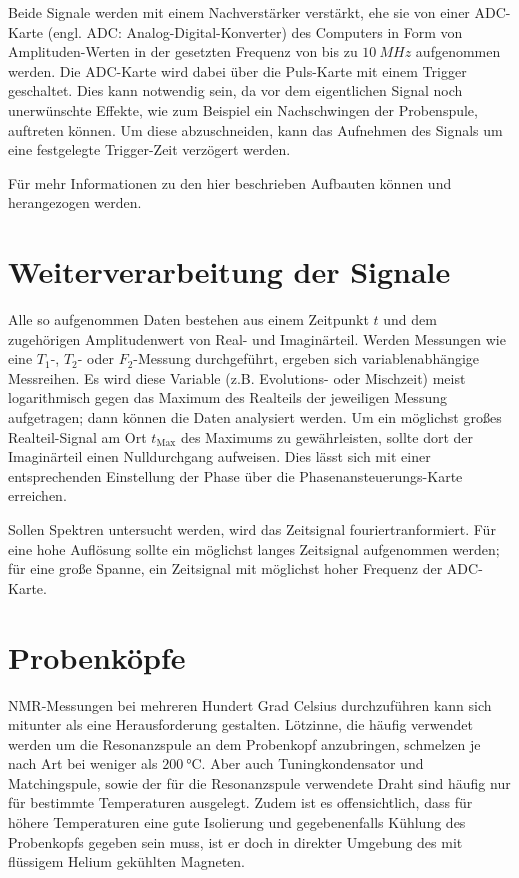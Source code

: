 Beide Signale werden mit einem Nachverstärker verstärkt, ehe sie von einer ADC-Karte (engl. ADC: Analog-Digital-Konverter) des Computers in Form von Amp\-li\-tu\-den-Wer\-ten in der gesetzten Frequenz von bis zu $\SI{10}{MHz}$ aufgenommen werden. Die ADC-Karte wird dabei über die Puls-Karte mit einem Trigger geschaltet. Dies kann notwendig sein, da vor dem eigentlichen Signal noch unerwünschte Effekte, wie zum Beispiel ein Nachschwingen der Probenspule, auftreten können. Um diese abzuschneiden, kann das Aufnehmen des Signals um eine festgelegte Trigger-Zeit verzögert werden.

Für mehr Informationen zu den hier beschrieben Aufbauten können \cite{lueg_implementierung_2016} und \cite{tilly_master} herangezogen werden.



\section{Weiterverarbeitung der Signale} \label{section:exp:weiterverarbeitung}

Alle so aufgenommen Daten bestehen aus einem Zeitpunkt $t$ und dem zugehörigen Amplitudenwert von Real- und Imaginärteil. Werden Messungen wie eine $T_1$-, $T_2$- oder $F_2$-Messung durchgeführt, ergeben sich variablenabhängige Messreihen. Es wird diese Variable (z.B. Evolutions- oder Mischzeit) meist logarithmisch gegen das Maximum des Realteils der jeweiligen Messung aufgetragen; dann können die Daten analysiert werden. Um ein möglichst großes Realteil-Signal am Ort $t_\text{Max}$ des Maximums zu gewährleisten, sollte dort der Imaginärteil einen Nulldurchgang aufweisen. Dies lässt sich mit einer entsprechenden Einstellung der Phase über die Phasenansteuerungs-Karte erreichen.

Sollen Spektren untersucht werden, wird das Zeitsignal fouriertranformiert. Für eine hohe Auflösung sollte ein möglichst langes Zeitsignal aufgenommen werden; für eine große Spanne, ein Zeitsignal mit möglichst hoher Frequenz der ADC-Karte.



\section{Probenköpfe} \label{section:exp:probenkoepfe}

NMR-Messungen bei mehreren Hundert Grad Celsius durchzuführen kann sich mitunter als eine Herausforderung gestalten. Lötzinne, die häufig verwendet werden um die Resonanzspule an dem Probenkopf anzubringen, schmelzen je nach Art bei weniger als $\SI{200}{\degreeCelsius}$. Aber auch Tuningkondensator und Matchingspule, sowie der für die Resonanzspule verwendete Draht sind häufig nur für bestimmte Temperaturen ausgelegt. Zudem ist es offensichtlich, dass für höhere Temperaturen eine gute Isolierung und gegebenenfalls Kühlung des Probenkopfs gegeben sein muss, ist er doch in direkter Umgebung des mit flüssigem Helium gekühlten Magneten.

